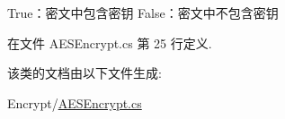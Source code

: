 True：密文中包含密钥 False：密文中不包含密钥 



在文件 A\-E\-S\-Encrypt.\-cs 第 25 行定义.



该类的文档由以下文件生成\-:\begin{DoxyCompactItemize}
\item 
Encrypt/\hyperlink{_a_e_s_encrypt_8cs}{A\-E\-S\-Encrypt.\-cs}\end{DoxyCompactItemize}
